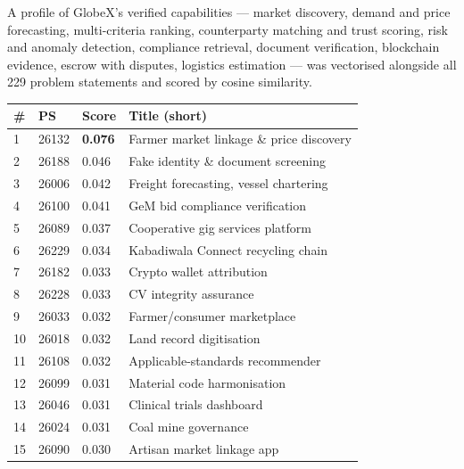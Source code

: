 \documentclass[11pt]{article}
\begin{document}
A profile of GlobeX's verified capabilities --- market discovery, demand and price forecasting,
multi-criteria ranking, counterparty matching and trust scoring, risk and anomaly detection, compliance
retrieval, document verification, blockchain evidence, escrow with disputes, logistics estimation ---
was vectorised alongside all 229 problem statements and scored by cosine similarity.

\vspace{0.5em}
\noindent\begin{minipage}[t]{0.55\textwidth}
\renewcommand{\arraystretch}{1.25}
{\footnotesize
\begin{tabular}{@{}p{0.6cm}p{1.15cm}p{1.1cm}p{4.6cm}@{}}
\toprule
\textbf{\#} & \textbf{PS} & \textbf{Score} & \textbf{Title (short)} \\
\midrule
\rowcolor{gxteal!12}
1 & 26132 & \textbf{0.076} & Farmer market linkage \& price discovery \\
2 & 26188 & 0.046 & Fake identity \& document screening \\
3 & 26006 & 0.042 & Freight forecasting, vessel chartering \\
4 & 26100 & 0.041 & GeM bid compliance verification \\
5 & 26089 & 0.037 & Cooperative gig services platform \\
6 & 26229 & 0.034 & Kabadiwala Connect recycling chain \\
7 & 26182 & 0.033 & Crypto wallet attribution \\
8 & 26228 & 0.033 & CV integrity assurance \\
9 & 26033 & 0.032 & Farmer/consumer marketplace \\
10 & 26018 & 0.032 & Land record digitisation \\
11 & 26108 & 0.032 & Applicable-standards recommender \\
12 & 26099 & 0.031 & Material code harmonisation \\
13 & 26046 & 0.031 & Clinical trials dashboard \\
14 & 26024 & 0.031 & Coal mine governance \\
15 & 26090 & 0.030 & Artisan market linkage app \\
\bottomrule
\end{tabular}}
\end{minipage}\hfill
\end{document}
